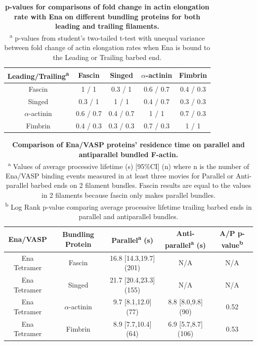 \begin{table}[!htb]
\centering
\begin{tabular}{ c c c c c }
\toprule 
Leading\slash Trailing\textsuperscript{a} & Fascin & Singed & $\alpha$-actinin & Fimbrin \\
\midrule
Fascin & 1 / 1 & 0.3 / 1 & 0.6 / 0.7 & 0.4 / 0.3 \\
Singed & 0.3 / 1 & 1 / 1 & 0.4 / 0.7 & 0.3 / 0.3 \\
$\alpha$-actinin & 0.6 / 0.7 & 0.4 / 0.7 & 1 / 1 & 0.7 / 0.3 \\
Fimbrin & 0.4 / 0.3 & 0.3 / 0.3 & 0.7 / 0.3 & 1 / 1 \\
\bottomrule
\end{tabular}
\caption[p-values for comparisons of fold change in actin elongation rate with Ena on different bundling proteins for both leading and trailing filaments.]{\textbf{p-values for comparisons of fold change in actin elongation rate with Ena on different bundling proteins for both leading and trailing filaments.} \\
\textsuperscript{a} p-values from student's two-tailed t-test with unequal variance between fold change of actin elongation rates when Ena is bound to the Leading or Trailing barbed end.}
\label{tab:ena-p-elongation-bundlers}
\end{table}

\begin{table}[!htb]
\centering
\begin{tabular}{ c c c c c }
\toprule 
Ena\slash VASP & Bundling Protein & Parallel\textsuperscript{a} (s) & Anti-parallel\textsuperscript{a} (s) & A/P p-value\textsuperscript{b} \\
\midrule
Ena Tetramer & Fascin & 16.8 [14.3,19.7] (201) & N/A & N/A \\
Ena Tetramer & Singed & 21.7 [20.4,23.3] (155) & N/A & N/A \\
Ena Tetramer & $\alpha$-actinin & 9.7 [8.1,12.0] (77) & 8.8 [8.0,9.8] (90) & 0.52 \\
Ena Tetramer & Fimbrin & 8.9 [7.7,10.4] (64) & 6.9 [5.7,8.7] (106) & 0.53 \\
\bottomrule
\end{tabular}
\caption[Comparison of Ena/VASP proteins' residence time on parallel and antiparallel bundled F-actin.]{\textbf{Comparison of Ena/VASP proteins' residence time on parallel and antiparallel bundled F-actin.} \\
\textsuperscript{a} Values of average processive lifetime (s) [95\%CI] (n) where n is the number of Ena/VASP binding events measured in at least three movies for Parallel or Anti-parallel barbed ends on 2 filament bundles. Fascin results are equal to the values in 2 filaments because fascin only makes parallel bundles. \\
\textsuperscript{b} Log Rank p-value comparing average processive lifetime trailing barbed ends in parallel and antiparallel bundles.
}
\label{tab:ena-parallel}
\end{table}

